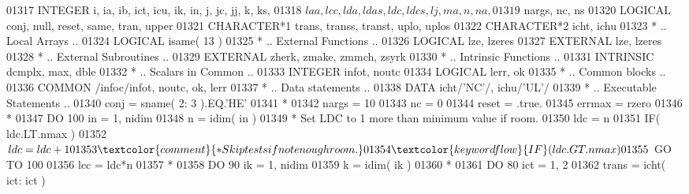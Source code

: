 \begin{DoxyCode}
01317       \textcolor{keywordtype}{INTEGER}            i, ia, ib, ict, icu, ik, in, j, jc, jj, k, ks,
01318      $                   laa, lcc, lda, ldas, ldc, ldcs, lj, ma, n, na,
01319      $                   nargs, nc, ns
01320       \textcolor{keywordtype}{LOGICAL}            conj, null, reset, same, tran, upper
01321       \textcolor{keywordtype}{CHARACTER*1}        trans, transs, transt, uplo, uplos
01322       \textcolor{keywordtype}{CHARACTER*2}        icht, ichu
01323 \textcolor{comment}{*     .. Local Arrays ..}
01324       \textcolor{keywordtype}{LOGICAL}            isame( 13 )
01325 \textcolor{comment}{*     .. External Functions ..}
01326       \textcolor{keywordtype}{LOGICAL}            lze, lzeres
01327       \textcolor{keywordtype}{EXTERNAL}           lze, lzeres
01328 \textcolor{comment}{*     .. External Subroutines ..}
01329       \textcolor{keywordtype}{EXTERNAL}           zherk, zmake, zmmch, zsyrk
01330 \textcolor{comment}{*     .. Intrinsic Functions ..}
01331       \textcolor{keywordtype}{INTRINSIC}          dcmplx, max, dble
01332 \textcolor{comment}{*     .. Scalars in Common ..}
01333       \textcolor{keywordtype}{INTEGER}            infot, noutc
01334       \textcolor{keywordtype}{LOGICAL}            lerr, ok
01335 \textcolor{comment}{*     .. Common blocks ..}
01336       \textcolor{keyword}{COMMON}             /infoc/infot, noutc, ok, lerr
01337 \textcolor{comment}{*     .. Data statements ..}
01338       \textcolor{keyword}{DATA}               icht/\textcolor{stringliteral}{'NC'}/, ichu/\textcolor{stringliteral}{'UL'}/
01339 \textcolor{comment}{*     .. Executable Statements ..}
01340       conj = sname( 2: 3 ).EQ.\textcolor{stringliteral}{'HE'}
01341 \textcolor{comment}{*}
01342       nargs = 10
01343       nc = 0
01344       reset = .true.
01345       errmax = rzero
01346 \textcolor{comment}{*}
01347       \textcolor{keywordflow}{DO} 100 in = 1, nidim
01348          n = idim( in )
01349 \textcolor{comment}{*        Set LDC to 1 more than minimum value if room.}
01350          ldc = n
01351          \textcolor{keywordflow}{IF}( ldc.LT.nmax )
01352      $      ldc = ldc + 1
01353 \textcolor{comment}{*        Skip tests if not enough room.}
01354          \textcolor{keywordflow}{IF}( ldc.GT.nmax )
01355      $      \textcolor{keywordflow}{GO TO} 100
01356          lcc = ldc*n
01357 \textcolor{comment}{*}
01358          \textcolor{keywordflow}{DO} 90 ik = 1, nidim
01359             k = idim( ik )
01360 \textcolor{comment}{*}
01361             \textcolor{keywordflow}{DO} 80 ict = 1, 2
01362                trans = icht( ict: ict )

\end{DoxyCode}
